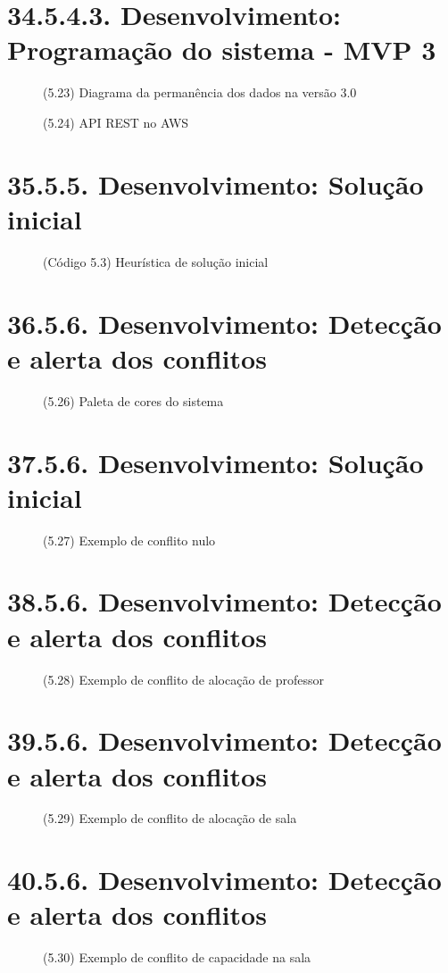 \chapter*{34.5.4.3. Desenvolvimento: Programação do sistema - MVP 3}
\begin{figure}[htpb]\caption{(5.23) Diagrama da permanência dos dados na versão 3.0}\end{figure}
\begin{figure}[htpb]\caption{(5.24) API REST no AWS}\end{figure}
\chapter*{35.5.5. Desenvolvimento: Solução inicial}
\begin{figure}[htpb]\caption{(Código 5.3) Heurística de solução inicial}\end{figure}
\chapter*{36.5.6. Desenvolvimento: Detecção e alerta dos conflitos}
\begin{figure}[htpb]\caption{(5.26) Paleta de cores do sistema}\end{figure}
\chapter*{37.5.6. Desenvolvimento: Solução inicial}
\begin{figure}[htpb]\caption{(5.27) Exemplo de conflito nulo}\end{figure}
\chapter*{38.5.6. Desenvolvimento: Detecção e alerta dos conflitos}
\begin{figure}[htpb]\caption{(5.28) Exemplo de conflito de alocação de professor}\end{figure}
\chapter*{39.5.6. Desenvolvimento: Detecção e alerta dos conflitos}
\begin{figure}[htpb]\caption{(5.29) Exemplo de conflito de alocação de sala}\end{figure}
\chapter*{40.5.6. Desenvolvimento: Detecção e alerta dos conflitos}
\begin{figure}[htpb]\caption{(5.30) Exemplo de conflito de capacidade na sala}\end{figure}
